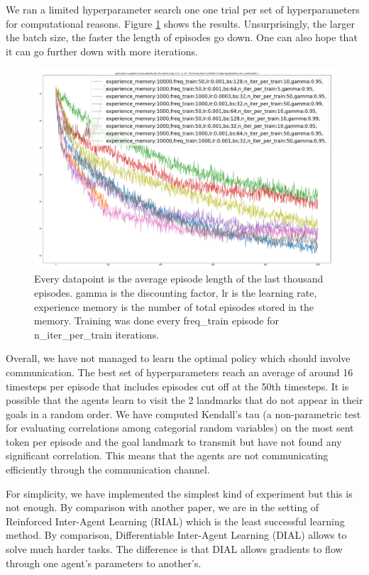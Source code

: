 \documentclass{article} %
\begin{document}
We ran a limited hyperparameter search one one trial per set of hyperparameters for computational reasons. Figure \ref{hyper_rpg} shows the results. Unsurprisingly, the larger the batch size, the faster the length of episodes go down. One can also hope that it can go further down with more iterations. 

\begin{figure}[h]
\label{hyper_rpg}
\centering
\includegraphics[width=\textwidth]{hyperparams_rpg.png}
\caption{Every datapoint is the average episode length of the last thousand episodes. gamma is the discounting factor, lr is the learning rate, experience memory is the number of total episodes stored in the memory. Training was done every freq\_train episode for n\_iter\_per\_train iterations.}
\end{figure}

Overall, we have not managed to learn the optimal policy which should involve communication. The best set of hyperparameters reach an average of around 16 timesteps per episode that includes episodes cut off at the 50th timesteps. It is possible that the agents learn to visit the 2 landmarks that do not appear in their goals in a random order. We have computed Kendall's tau (a non-parametric test for evaluating correlations among categorial random variables) on the most sent token per episode and the goal landmark to transmit but have not found any significant correlation. This means that the agents are not communicating efficiently through the communication channel.

For simplicity, we have implemented the simplest kind of experiment but this is not enough. By comparison with another paper\cite{foerster2016learning}, we are in the setting of Reinforced Inter-Agent Learning (RIAL) which is the least successful learning method. By comparison, Differentiable Inter-Agent Learning (DIAL) allows to solve much harder tasks. The difference is that DIAL allows gradients to flow through one agent's parameters to another's. 
\end{document}
